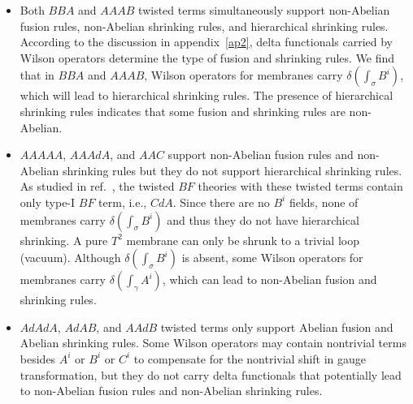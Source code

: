 \documentclass[11pt,nofootinbib,preprint]{revtex4-1}
\begin{document}
\begin{itemize}
\item Both $BBA$ and $AAAB$ twisted terms simultaneously support non-Abelian fusion rules, non-Abelian shrinking rules, and hierarchical shrinking rules. According to the discussion in appendix~\ref{ap2}, delta functionals carried by Wilson operators determine the type of fusion and shrinking rules. We find that in $BBA$ and $AAAB$, Wilson operators for membranes carry $\delta \left( \int_{\sigma}{B^i} \right) $, which will lead to hierarchical shrinking rules. The presence of hierarchical shrinking rules indicates that some fusion and shrinking rules are non-Abelian.

\item $AAAAA$, $AAAdA$, and $AAC$ support non-Abelian fusion rules and non-Abelian shrinking rules but they do not support hierarchical shrinking rules. As studied in ref.~\cite{Zhang:2021ycl}, the twisted $BF$ theories with these twisted terms contain only type-I $BF$ term, i.e., $CdA$. Since there are no $B^i$ fields, none of membranes carry $\delta \left( \int_{\sigma}{B^i} \right) $ and thus they do not have hierarchical shrinking. A pure $T^2$ membrane can only be shrunk to a trivial loop (vacuum). Although $\delta \left( \int_{\sigma}{B^i} \right) $ is absent, some Wilson operators for membranes carry $\delta \left( \int_{\gamma}{A^i} \right) $, which can lead to non-Abelian fusion and shrinking rules.

\item $AdAdA$, $AdAB$, and $AAdB$ twisted terms only support Abelian fusion and Abelian shrinking rules. Some Wilson operators may contain nontrivial terms besides $A^i$ or $B^i$ or $C^i$ to compensate for the nontrivial shift in gauge transformation, but they do not carry delta functionals that potentially lead to non-Abelian fusion rules and non-Abelian shrinking rules.
\end{itemize}
\end{document}
